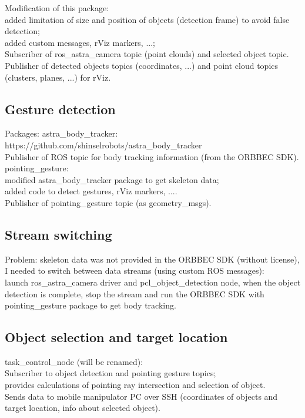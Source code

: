 Modification of this package: \\
added limitation of size and position of objects (detection frame) to avoid false detection;\\
added custom messages, rViz markers, ...;\\

Subscriber of ros\_astra\_camera topic (point clouds) and selected object topic.\\
Publisher of detected objects topics (coordinates, ...) and point cloud topics (clusters, planes, ...) for rViz.\\

\subsection{Gesture detection}
Packages: 
astra\_body\_tracker:\\
https://github.com/shinselrobots/astra\_body\_tracker\\
Publisher of ROS topic for body tracking information (from the ORBBEC SDK).\\

pointing\_gesture:\\
modified astra\_body\_tracker package to get skeleton data;\\
added code to detect gestures, rViz markers, ....\\

Publisher of pointing\_gesture topic (as geometry\_msgs).\\

\subsection{Stream switching}
Problem: skeleton data was not provided in the ORBBEC SDK (without license), I needed to switch between data streams (using custom ROS messages):\\
launch ros\_astra\_camera driver and pcl\_object\_detection node, when the object detection is complete, stop the stream and run the ORBBEC SDK with pointing\_gesture package to get body tracking.

\subsection{Object selection and target location}
task\_control\_node (will be renamed):\\
Subscriber to object detection and pointing gesture topics;\\
provides calculations of pointing ray intersection and selection of object.\\
Sends data to mobile manipulator PC over SSH (coordinates of objects and target location, info about selected object).\\


